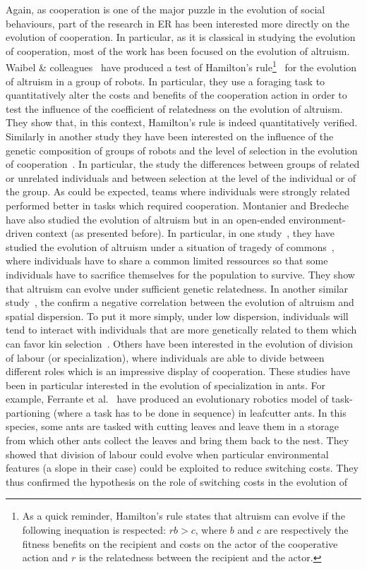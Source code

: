     Again, as cooperation is one of the major puzzle in the evolution of social behaviours, part of the research in ER has been interested more directly on the evolution of cooperation. In particular, as it is classical in studying the evolution of cooperation, most of the work has been focused on the evolution of altruism. Waibel \& colleagues~\parencite{Waibel2011} have produced a test of Hamilton's rule\footnote{As a quick reminder, Hamilton's rule states that altruism can evolve if the following inequation is respected: $rb > c$, where $b$ and $c$ are respectively the fitness benefits on the recipient and costs on the actor of the cooperative action and $r$ is the relatedness between the recipient and the actor.}~\parencite{Hamilton1964} for the evolution of altruism in a group of robots. In particular, they use a foraging task to quantitatively alter the costs and benefits of the cooperation action in order to test the influence of the coefficient of relatedness on the evolution of altruism. They show that, in this context, Hamilton's rule is indeed quantitatively verified. Similarly in another study they have been interested on the influence of the genetic composition of groups of robots and the level of selection in the evolution of cooperation~\parencite{Waibel2009}. In particular, the study the differences between groups of related or unrelated individuals and between selection at the level of the individual or of the group. As could be expected, teams where individuals were strongly related performed better in tasks which required cooperation. Montanier and Bredeche have also studied the evolution of altruism but in an open-ended environment-driven context (as presented before). In particular, in one study~\parencite{Montanier2011}, they have studied the evolution of altruism under a situation of tragedy of commons~\parencite{Hardin1968}, where individuals have to share a common limited ressources so that some individuals have to sacrifice themselves for the population to survive. They show that altruism can evolve under sufficient genetic relatedness. In another similar study~\parencite{Montanier2013}, the confirm a negative correlation between the evolution of altruism and spatial dispersion. To put it more simply, under low dispersion, individuals will tend to interact with individuals that are more genetically related to them which can favor kin selection~\parencite{VanBaalen1998}. Others have been interested in the evolution of division of labour (or specialization), where individuals are able to divide between different roles which is an impressive display of cooperation. These studies have been in particular interested in the evolution of specialization in ants. For example, Ferrante et al.~\parencite{Ferrante2015} have produced an evolutionary robotics model of task-partioning (where a task has to be done in sequence) in leafcutter ants. In this species, some ants are tasked with cutting leaves and leave them in a storage from which other ants collect the leaves and bring them back to the nest. They showed that division of labour could evolve when particular environmental features (a slope in their case) could be exploited to reduce switching costs. They thus confirmed the hypothesis on the role of switching costs in the evolution of 